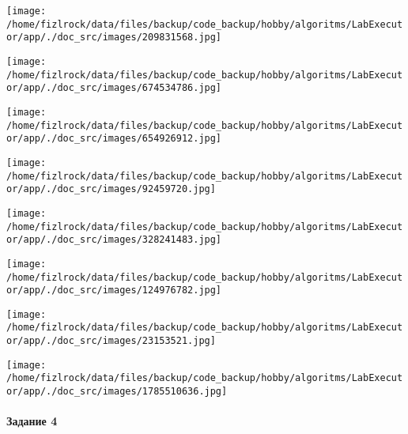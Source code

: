 \documentclass[a4paper, 12pt]{article}
\begin{document}
\texttt{[image: /home/fizlrock/data/files/backup/code\_backup/hobby/algoritms/LabExecutor/app/./doc\_src/images/209831568.jpg]}

\texttt{[image: /home/fizlrock/data/files/backup/code\_backup/hobby/algoritms/LabExecutor/app/./doc\_src/images/674534786.jpg]}

\texttt{[image: /home/fizlrock/data/files/backup/code\_backup/hobby/algoritms/LabExecutor/app/./doc\_src/images/654926912.jpg]}

\texttt{[image: /home/fizlrock/data/files/backup/code\_backup/hobby/algoritms/LabExecutor/app/./doc\_src/images/92459720.jpg]}

\texttt{[image: /home/fizlrock/data/files/backup/code\_backup/hobby/algoritms/LabExecutor/app/./doc\_src/images/328241483.jpg]}

\texttt{[image: /home/fizlrock/data/files/backup/code\_backup/hobby/algoritms/LabExecutor/app/./doc\_src/images/124976782.jpg]}

\texttt{[image: /home/fizlrock/data/files/backup/code\_backup/hobby/algoritms/LabExecutor/app/./doc\_src/images/23153521.jpg]}

\texttt{[image: /home/fizlrock/data/files/backup/code\_backup/hobby/algoritms/LabExecutor/app/./doc\_src/images/1785510636.jpg]}
\pagebreak
\paragraph{Задание 4}
\end{document}
